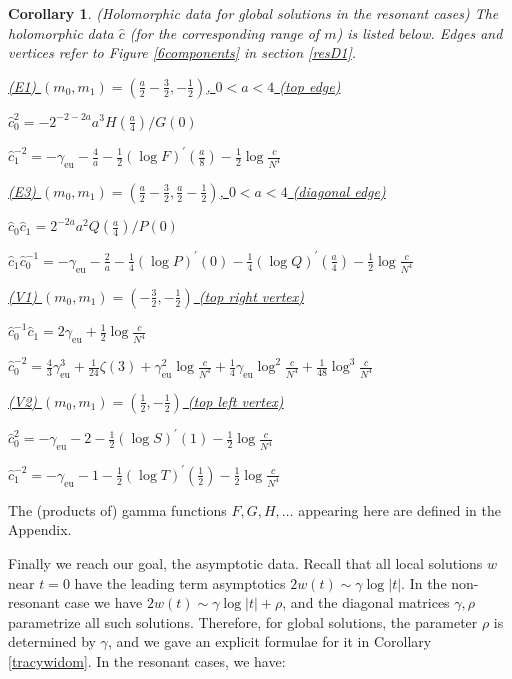\documentclass[a4paper,12pt,leqno]{amsart}
\numberwithin{equation}{section}
\theoremstyle{plain}
\newtheorem{corollary}[theorem]{Corollary}
\theoremstyle{definition}
\newcommand{\ga}{\gamma}
\newcommand{\no}{\noindent}
\newcommand{\pr}{\prime}
\newcommand{\nn}{m}
\newcommand{\euler}{\gamma_{\scriptscriptstyle\text{eu}}}
\begin{document}
{\begin{corollary}\label{Rholomorphicdata} 
{\em(Holomorphic data for global solutions in the resonant cases)}
The holomorphic data $\hat c$ (for the corresponding range of $\nn$)
is listed below. Edges and vertices refer to Figure \ref{6components} in section \ref{resD1}.

\no 
\underline
{\em
(E1) $(m_0,m_1)=(\tfrac a2 - \tfrac32,-\tfrac12)$, $0<a<4$ (top edge)
}

\no
$
\hat c_0^2= - 2^{-2-2a} a^3 H(\tfrac a4) / G(0)
$

\no
$
\hat c_1^{-2}= - \euler - \tfrac4a - \tfrac12 (\log F)^\pr(\tfrac a8) - \tfrac12 \log \tfrac{c}{N^4}
$

\no 
\underline
{\em
(E3) $(m_0,m_1)=(\tfrac a2 - \tfrac32,\tfrac a2 - \tfrac12)$, $0<a<4$
(diagonal edge)
}

\no
$
\hat c_0 \hat c_1 = 
2^{-2a} a^2 Q(\tfrac a4) / P(0)
$

\no
$
\hat c_1 \hat c_0^{-1} =
- \euler - \tfrac2a - \tfrac14 (\log P)^\pr(0) 
- \tfrac14 (\log Q)^\pr(\tfrac a4) - \tfrac12 \log \tfrac{c}{N^4}
$

\no 
\underline
{\em(V1) 
$(m_0,m_1)=(-\tfrac32,-\tfrac12)$ (top right vertex)
}

\no
$
\hat c_0^{-1} \hat c_1=  2\euler + \tfrac12 \log\tfrac{c}{N^4}
$

\no
$
\hat c_0^{-2}= \tfrac43 \euler^3 + \tfrac1{24} \zeta(3) +
\euler^2 \log\tfrac{c}{N^4}
+\tfrac14\euler \log^2\tfrac{c}{N^4}
+\tfrac1{48} \log^3\tfrac{c}{N^4}
$

\no 
\underline
{\em
(V2) $(m_0,m_1)=(\tfrac12,-\tfrac12)$ (top left vertex)
}

\no
$
\hat c_0^2= 
- \euler - 2 - \tfrac12 (\log S)^\pr(1) - \tfrac12 \log \tfrac{c}{N^4}
$

\no
$
\hat c_1^{-2}= 
- \euler - 1 - \tfrac12 (\log T)^\pr(\tfrac12) - \tfrac12 \log \tfrac{c}{N^4}
$
\end{corollary}

The (products of) gamma functions $F,G,H,\dots$ 
appearing here are defined in the Appendix.

Finally we reach our goal, the asymptotic data.
Recall that all local solutions $w$ near $t=0$ have the leading term asymptotics $2w(t)\sim \ga \log\vert t\vert$. In the non-resonant case we have $2w(t)\sim \ga \log\vert t\vert+\rho$, and the diagonal matrices $\ga,\rho$ parametrize all such solutions. Therefore, for global solutions, the parameter $\rho$ is determined by $\ga$, and we gave an explicit formulae for it in Corollary \ref{tracywidom}.  In the resonant cases, we have:

}
\end{document}
